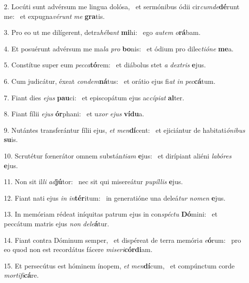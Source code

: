 2. Locúti sunt advérsum me lingua dolósa, \dag\  et sermónibus ódii cir\textit{cum}\textit{de}\textbf{dé}runt me: \ast\  et expugna\textit{vé}\textit{runt} \textit{me} \textbf{gra}tis.\

3. Pro eo ut me dilígerent, detra\textit{hé}\textit{bant} \textbf{mi}hi: \ast\  ego \textit{au}\textit{tem} \textit{o}\textbf{rá}bam.\

4. Et posuérunt advérsum me ma\textit{la} \textit{pro} \textbf{bo}nis: \ast\  et ódium pro dilec\textit{ti}\textit{ó}\textit{ne} \textbf{me}a.\

5. Constítue super eum \textit{pec}\textit{ca}\textbf{tó}rem: \ast\  et diábolus stet \textit{a} \textit{dex}\textit{tris} \textbf{e}jus.\

6. Cum judicátur, éxeat \textit{con}\textit{dem}\textbf{ná}tus: \ast\  et orátio ejus fi\textit{at} \textit{in} \textit{pec}\textbf{cá}tum.\

7. Fiant dies \textit{e}\textit{jus} \textbf{pau}ci: \ast\  et episcopátum ejus ac\textit{cí}\textit{pi}\textit{at} \textbf{al}ter.\

8. Fiant fílii \textit{e}\textit{jus} \textbf{ór}phani: \ast\  et u\textit{xor} \textit{e}\textit{jus} \textbf{ví}\textbf{du}a.\

9. Nutántes transferántur fílii ejus, \textit{et} \textit{men}\textbf{dí}cent: \ast\  et ejiciántur de habitati\textit{ó}\textit{ni}\textit{bus} \textbf{su}is.\

10. Scrutétur fœnerátor omnem substán\textit{ti}\textit{am} \textbf{e}jus: \ast\  et dirípiant aliéni \textit{la}\textit{bó}\textit{res} \textbf{e}jus.\

11. Non sit il\textit{li} \textit{ad}\textbf{jú}tor: \ast\  nec sit qui misereátur \textit{pu}\textit{píl}\textit{lis} \textbf{e}jus.\

12. Fiant nati ejus \textit{in} \textit{in}\textbf{tér}itum: \ast\  in generatióne una deleá\textit{tur} \textit{no}\textit{men} \textbf{e}jus.\

13. In memóriam rédeat iníquitas patrum ejus in con\textit{spéc}\textit{tu} \textbf{Dó}mini: \ast\  et peccátum matris ejus \textit{non} \textit{de}\textit{le}\textbf{á}tur.\

14. Fiant contra Dóminum semper, \dag\  et dispéreat de terra memóri\textit{a} \textit{e}\textbf{ó}rum: \ast\  pro eo quod non est recordátus fácere \textit{mi}\textit{se}\textit{ri}\textbf{cór}\textbf{di}am.\

15. Et persecútus est hóminem ínopem, \textit{et} \textit{men}\textbf{dí}cum, \ast\  et compúnctum corde \textit{mor}\textit{ti}\textit{fi}\textbf{cá}re.\

